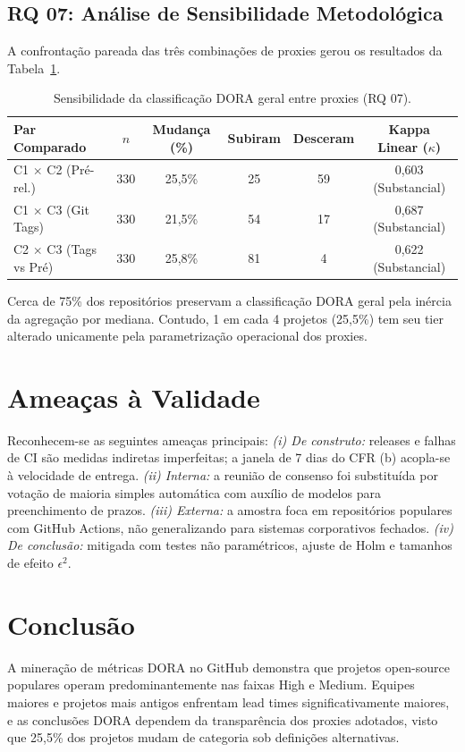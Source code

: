 \documentclass[12pt]{article}
\begin{document}
\subsection{RQ 07: Análise de Sensibilidade Metodológica}
A confrontação pareada das três combinações de proxies gerou os resultados da Tabela~\ref{tab:sensibilidade}.

\begin{table}[ht]
\centering
\caption{Sensibilidade da classificação DORA geral entre proxies (RQ 07).}
\label{tab:sensibilidade}
\small
\begin{tabular}{lccccc}
\toprule
\textbf{Par Comparado} & \textbf{$n$} & \textbf{Mudança (\%)} & \textbf{Subiram} & \textbf{Desceram} & \textbf{Kappa Linear ($\kappa$)} \\
\midrule
C1 $\times$ C2 (Pré-rel.) & 330 & 25,5\% & 25 & 59 & 0,603 (Substancial) \\
C1 $\times$ C3 (Git Tags) & 330 & 21,5\% & 54 & 17 & 0,687 (Substancial) \\
C2 $\times$ C3 (Tags vs Pré) & 330 & 25,8\% & 81 & 4 & 0,622 (Substancial) \\
\bottomrule
\end{tabular}
\end{table}

Cerca de 75\% dos repositórios preservam a classificação DORA geral pela inércia da agregação por mediana. Contudo, 1 em cada 4 projetos (25,5\%) tem seu tier alterado unicamente pela parametrização operacional dos proxies.

\section{Ameaças à Validade}
Reconhecem-se as seguintes ameaças principais: \textit{(i) De construto:} releases e falhas de CI são medidas indiretas imperfeitas; a janela de 7 dias do CFR (b) acopla-se à velocidade de entrega. \textit{(ii) Interna:} a reunião de consenso foi substituída por votação de maioria simples automática com auxílio de modelos para preenchimento de prazos. \textit{(iii) Externa:} a amostra foca em repositórios populares com GitHub Actions, não generalizando para sistemas corporativos fechados. \textit{(iv) De conclusão:} mitigada com testes não paramétricos, ajuste de Holm e tamanhos de efeito $\epsilon^2$.

\section{Conclusão}
A mineração de métricas DORA no GitHub demonstra que projetos open-source populares operam predominantemente nas faixas High e Medium. Equipes maiores e projetos mais antigos enfrentam lead times significativamente maiores, e as conclusões DORA dependem da transparência dos proxies adotados, visto que 25,5\% dos projetos mudam de categoria sob definições alternativas.
\end{document}
